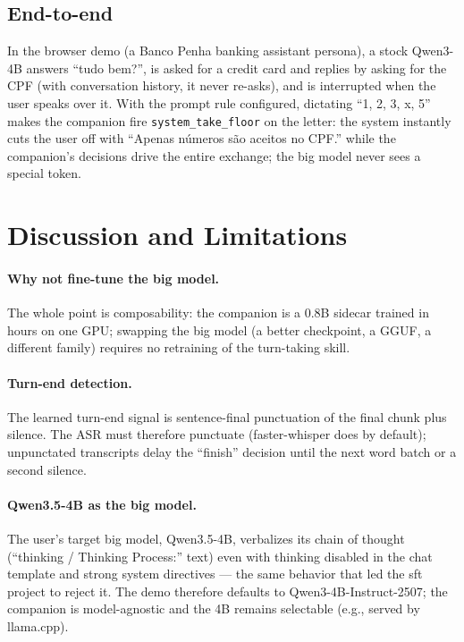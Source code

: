 \documentclass[conference]{IEEEtran}
\begin{document}
\subsection{End-to-end}
In the browser demo (a Banco Penha banking assistant persona), a stock
Qwen3-4B answers ``tudo bem?'', is asked for a credit card and replies by
asking for the CPF (with conversation history, it never re-asks), and is
interrupted when the user speaks over it. With the prompt rule configured,
dictating ``1, 2, 3, x, 5'' makes the companion fire
\texttt{system\_take\_floor} on the letter: the system instantly cuts the
user off with ``Apenas números são aceitos no CPF.'' while the companion's
decisions drive the entire exchange; the big model never sees a special
token.

\section{Discussion and Limitations}
\label{sec:discussion}

\paragraph{Why not fine-tune the big model.} The whole point is
composability: the companion is a 0.8B sidecar trained in hours on one GPU;
swapping the big model (a better checkpoint, a GGUF, a different family)
requires no retraining of the turn-taking skill.

\paragraph{Turn-end detection.} The learned turn-end signal is
sentence-final punctuation of the final chunk plus silence. The ASR must
therefore punctuate (faster-whisper does by default); unpunctated transcripts
delay the ``finish'' decision until the next word batch or a second silence.

\paragraph{Qwen3.5-4B as the big model.} The user's target big model,
Qwen3.5-4B, verbalizes its chain of thought (``thinking / Thinking
Process:'' text) even with thinking disabled in the chat template and strong
system directives — the same behavior that led the sft project to reject it.
The demo therefore defaults to Qwen3-4B-Instruct-2507; the companion is
model-agnostic and the 4B remains selectable (e.g., served by llama.cpp).
\end{document}
